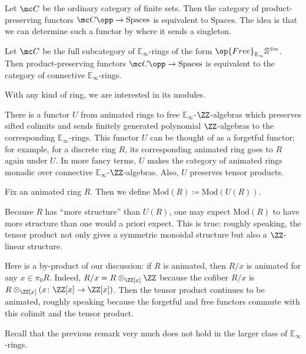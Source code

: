 \documentclass[../notes.tex]{subfiles}
\begin{document}
\begin{example}
	Let $\mc C$ be the ordinary category of finite sets. Then the category of product-preserving functors $\mc C\opp\to\mathrm{Spaces}$ is equivalent to $\mathrm{Spaces}$. The idea is that we can determine such a functor by where it sends a singleton.
\end{example}
\begin{example}
	Let $\mc C$ be the full subcategory of $\mathbb E_\infty$-rings of the form $\op{Free}_{\mathbb E_\infty}\mathbb S^{\oplus n}$. Then product-pre\-serving functors $\mc C\opp\to\mathrm{Spaces}$ is equivalent to the category of connective $\mathbb E_\infty$-rings.
\end{example}
With any kind of ring, we are interested in its modules.
\begin{remark}
	There is a functor $U$ from animated rings to free $\mathbb E_\infty$-$\ZZ$-algebras which preserves sifted colimits and sends finitely generated polynomial $\ZZ$-algebras to the corresponding $\mathbb E_\infty$-rings. This functor $U$ can be thought of as a forgetful functor; for example, for a discrete ring $R$, its corresponding animated ring goes to $R$ again under $U$. In more fancy terms, $U$ makes the category of animated rings monadic over connective $\mathbb E_\infty$-$\ZZ$-algebras. Also, $U$ preserves tensor products.
\end{remark}
\begin{definition}[module]
	Fix an animated ring $R$. Then we define $\mathrm{Mod}(R)\coloneqq\mathrm{Mod}(U(R))$.
\end{definition}
\begin{remark}
	Because $R$ has ``more structure'' than $U(R)$, one may expect $\mathrm{Mod}(R)$ to have more structure than one would a priori expect. This is true: roughly speaking, the tensor product not only gives a symmetric monoidal structure but also a $\ZZ$-linear structure.
\end{remark}
\begin{remark}
	Here is a by-product of our discussion: if $R$ is animated, then $R/x$ is animated for any $x\in\pi_0R$. Indeed, $R/x=R\otimes_{\ZZ[x]}\ZZ$ because the cofiber $R/x$ is $R\otimes_{\ZZ[x]}(x\colon\ZZ[x]\to\ZZ[x])$. Then the tensor product continues to be animated, roughly speaking because the forgetful and free functors commute with this colimit and the tensor product.
\end{remark}
Recall that the previous remark very much does not hold in the larger class of $\mathbb E_\infty$-rings.
\end{document}

